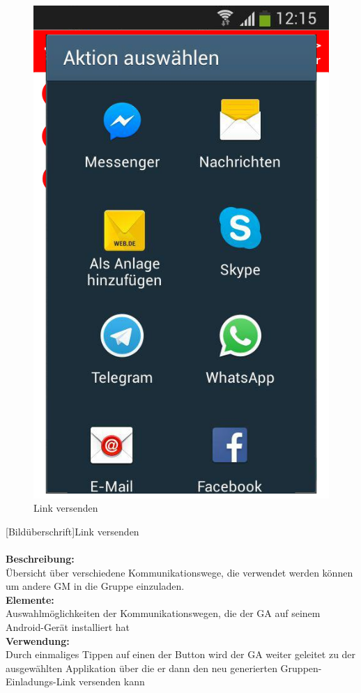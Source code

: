 \begin{figure} [H]
	\caption{Link versenden}
\begin{center}
	\includegraphics[scale =0.5]{resources/images/link_versenden.png}
\end{center}
\end{figure}
[Bildüberschrift]Link versenden\\ \\
\textbf{Beschreibung:}\\
Übersicht über verschiedene Kommunikationswege, die verwendet werden können um andere GM in die Gruppe einzuladen.\\
\textbf{Elemente:}\\
Auswahlmöglichkeiten der Kommunikationswegen, die der GA auf seinem Android-Gerät installiert hat\\
\textbf{Verwendung:}\\
Durch einmaliges Tippen auf einen der Button wird der GA weiter geleitet zu der ausgewählten Applikation über die er dann den neu generierten Gruppen-Einladungs-Link versenden kann\\ \\


